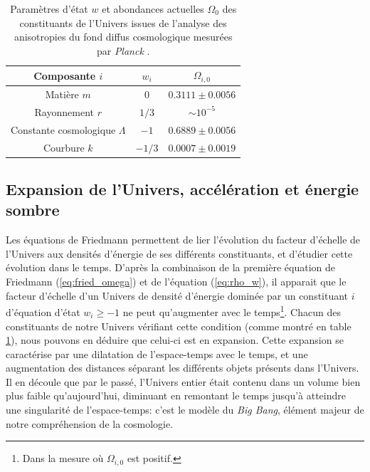 \begin{table}[t]
    \small
    \centering
    \begin{tabular}{c c c}
        \toprule
        Composante $i$ & $w_i$ & $\Omega_{i,0}$ \\
        \midrule
        Matière $m$                         & $0$     & $0.3111 \pm 0.0056$ \\
        Rayonnement $r$                     & $1/3$   & $\sim 10^{-5}$ \\
        Constante cosmologique $\Lambda$    & $-1$    & $0.6889 \pm 0.0056$ \\
        Courbure $k$                        & $-1/3$  & $0.0007 \pm 0.0019$ \\
        \bottomrule
    \end{tabular}
    \caption{%
        Paramètres d'état $w$ et abondances actuelles $\Omega_0$ des constituants de l'Univers issues de l'analyse des anisotropies du fond diffus cosmologique mesurées par \textit{Planck} \cite{planck_collaboration_planck_2020}.
    }
    \label{tab:cosmo_params}
\end{table}

\subsection{Expansion de l'Univers, accélération et énergie sombre}
\label{sec:dark_energy}

Les équations de Friedmann permettent de lier l'évolution du facteur d'échelle de l'Univers aux densités d'énergie de ses différents constituants, et d'étudier cette évolution dans le temps.
D'après la combinaison de la première équation de Friedmann (\ref{eq:fried_omega}) et de l'équation (\ref{eq:rho_w}), il apparait que le facteur d'échelle d'un Univers de densité d'énergie dominée par un constituant $i$ d'équation d'état $w_i \geqslant -1$ ne peut qu'augmenter avec le temps\footnote{Dans la mesure où $\Omega_{i, 0}$ est positif.}.
Chacun des constituants de notre Univers vérifiant cette condition (comme montré en table \ref{tab:cosmo_params}), nous pouvons en déduire que celui-ci est en expansion.
Cette expansion se caractérise par une dilatation de l'espace-temps avec le temps, et une augmentation des distances séparant les différents objets présents dans l'Univers.
Il en découle que par le passé, l'Univers entier était contenu dans un volume bien plus faible qu'aujourd'hui, diminuant en remontant le temps jusqu'à atteindre une singularité de l'espace-temps: c'est le modèle du \textit{Big Bang}, élément majeur de notre compréhension de la cosmologie.

